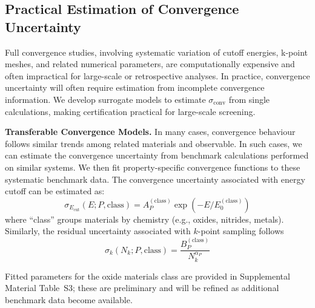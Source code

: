 \documentclass[prb,twocolumn,superscriptaddress,amsmath,amssymb,longbibliography]{revtex4-2}
\newcommand{\Ecut}{E_{\mathrm{cut}}}
\newcommand{\conv}{\mathrm{conv}}
\newcommand{\Nk}{N_k}
\begin{document}

\subsection{Practical Estimation of Convergence Uncertainty}
\label{sec:practical}

Full convergence studies, involving systematic variation of cutoff energies, k-point meshes, and related numerical parameters, are computationally expensive and often impractical for large-scale or retrospective analyses. In practice, convergence uncertainty will often require estimation from incomplete convergence information.
We develop surrogate models to estimate 
$\sigma_\conv$ from single calculations, making certification practical for 
large-scale screening.

{\bf Transferable Convergence Models.}
In many cases, convergence behaviour follows similar trends among related materials and observable. In such cases, we can estimate the convergence uncertainty from benchmark calculations performed on similar systems. We then fit property-specific convergence functions to these systematic benchmark data. 
The convergence uncertainty associated with energy cutoff can be estimated as\cite{Payne1992}:
\begin{equation}
    \sigma_{\Ecut}(E; P, \text{class}) = A_P^{(\text{class})} 
    \exp\left(-E / E_0^{(\text{class})}\right)
    \label{eq:cutoff_model}
\end{equation}
where ``class'' groups materials by chemistry (e.g., oxides, nitrides, metals). 
Similarly, the residual uncertainty associated with $k$-point sampling follows \cite{Monkhorst1976,Wisesa2016}
\begin{equation}
    \sigma_k(\Nk; P, \text{class}) = \frac{B_P^{(\text{class})}}{\Nk^{\alpha_P}}
    \label{eq:kpoint_model}
\end{equation}

Fitted parameters for the oxide materials class are provided in 
Supplemental Material Table~S3; these are preliminary and will be 
refined as additional benchmark data become available.
\end{document}
